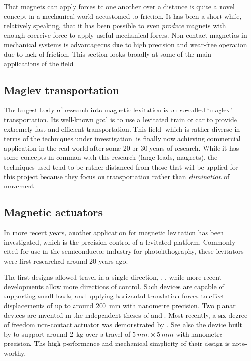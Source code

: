 That magnets can apply forces to one another over a distance is quite a novel
concept in a mechanical world accustomed to friction. It has been a short
while, relatively speaking, that it has been possible to even \emph{produce}
magnets with enough coercive force to apply useful mechanical forces.
Non-contact magnetics in mechanical systems is advantageous due to high
precision and wear-free operation due to lack of friction. This section looks
broadly at some of the main applications of the field.

\subsection{Maglev transportation}

The largest body of research into magnetic levitation is on so-called `maglev'
transportation. Its well-known goal is to use a levitated train or car to
provide extremely fast and efficient transportation. This field, which is
rather diverse in terms of the techniques under investigation, is finally now
achieving commercial application in the real world after some 20 or 30 years
of research. While it has some concepts in common with this research (large
loads, magnets), the techniques used tend to be rather distanced from those
that will be applied for this project because they focus on transportation
rather than \emph{elimination} of movement.

\subsection{Magnetic actuators}

In more recent years, another application for magnetic levitation has been
investigated, which is the precision control of a levitated platform. Commonly
cited for use in the semiconductor industry for photolithography, these
levitators were first researched around 20 years ago.

The first designs allowed travel in a single direction, \eg,
\textcite{trumper1992}, while more recent developments allow more directions
of control. Such devices are capable of supporting small loads, and applying
horizontal translation forces to effect displacements of up to around
\SI{200}{mm} with nanometre precision. Two planar devices are invented in the
independent theses of \textcite{kim1997} and \textcite{molenaar2000}. Most
recently, a six degree of freedom non-contact actuator was demonstrated by
\textcite{verma2004}. See also the device built by \textcite{kim2007} to
support around \SI{2}{kg} over a travel of $\SI{5}{mm}\times\SI{5}{mm}$ with
nanometre precision. The high performance and mechanical simplicity of their
design is note-worthy.

